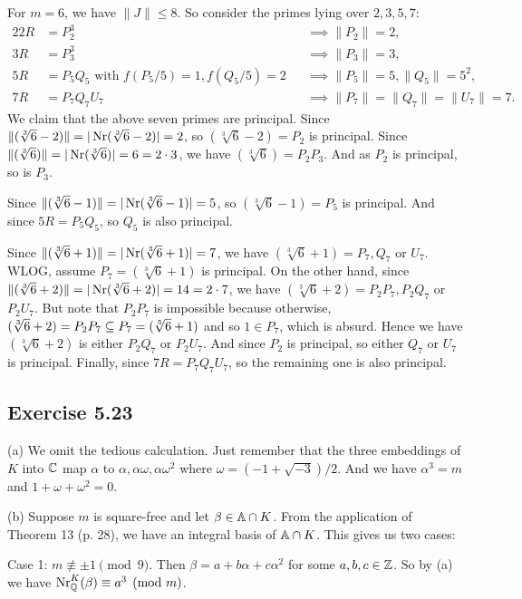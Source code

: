 \documentclass[../Marcus.tex]{subfiles}
\begin{document}
For $m=6$, we have $\|J\| \leq 8$. So consider the primes lying over $2,3,5,7$:
\begin{alignat*}{2}
2R &= P_2^3 &&\implies \|P_2\| = 2,   \\
3R &= P_3^3 &&\implies \|P_3\| = 3,    \\
5R &= P_5Q_5 \text{ with } f(P_5/5) = 1, f(Q_5/5) = 2 &&\implies \|P_5\| = 5, \|Q_5\| = 5^2,    \\
7R &= P_7Q_7U_7 &&\implies \|P_7\| = \|Q_7\| = \|U_7\| = 7.
\end{alignat*}
We claim that the above seven primes are principal. Since $\|(\sqrt[3]{6}-2)\| = |\Nr(\sqrt[3]{6}-2)| = 2$, so $(\sqrt[3]{6}-2) = P_2$ is principal. Since $\|(\sqrt[3]{6})\| = |\Nr(\sqrt[3]{6})| = 6 = 2\cdot 3$, we have $(\sqrt[3]{6}) = P_2P_3$. And as $P_2$ is principal, so is $P_3$.

Since $\|(\sqrt[3]{6}-1)\| = |\Nr(\sqrt[3]{6}-1)| = 5$, so $(\sqrt[3]{6}-1) = P_5$ is principal. And since $5R = P_5Q_5$, so $Q_5$ is also principal.

Since $\|(\sqrt[3]{6}+1)\| = |\Nr(\sqrt[3]{6}+1)| = 7$, we have $(\sqrt[3]{6}+1) = P_7,Q_7$ or $U_7$. WLOG, assume $P_7=(\sqrt[3]{6}+1)$ is principal. On the other hand, since $\|(\sqrt[3]{6}+2)\| = |\Nr(\sqrt[3]{6}+2)| = 14 = 2\cdot 7$, we have $(\sqrt[3]{6}+2) = P_2P_7,P_2Q_7$ or $P_2U_7$. But note that $P_2P_7$ is impossible because otherwise, $(\sqrt[3]{6}+2) = P_2P_7 \sbe P_7 = (\sqrt[3]{6}+1)$ and so $1 \in P_7$, which is absurd. Hence we have $(\sqrt[3]{6}+2)$ is either $P_2Q_7$ or $P_2U_7$. And since $P_2$ is principal, so either $Q_7$ or $U_7$ is principal. Finally, since $7R = P_7Q_7U_7$, so the remaining one is also principal.

\subsection*{Exercise 5.23}

(a) We omit the tedious calculation. Just remember that the three embeddings of $K$ into $\CC$ map $\alpha$ to $\alpha,\alpha\omega,\alpha\omega^2$ where $\omega=(-1+\sqrt{-3})/2$. And we have $\alpha^3 = m$ and $1+\omega+\omega^2=0$.

(b) Suppose $m$ is square-free and let $\beta \in \AA \cap K$. From the application of Theorem 13 (p. 28), we have an integral basis of $\AA \cap K$. This gives us two cases:

Case 1: $m\not\equiv\pm1\pmod{9}$. Then $\beta = a+b\alpha+c\alpha^2$ for some $a,b,c\in \ZZ$. So by (a) we have $\NrKQ(\beta) \equiv a^3 \pmod{m}$.
\end{document}
